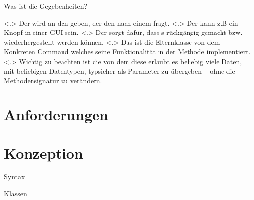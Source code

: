 \begin{frame}{Was ist die Gegebenheiten?}
\begin{itemize}[<+- | alert@+>]
            \note[item]<.>{
              Der  wird an den  geben, der den  nach einem  fragt.
            }
            \note[item]<.>{
              Der  kann z.B ein Knopf in einer GUI sein.
            }
            \note[item]<.>{
              Der  sorgt dafür, dass s rückgängig gemacht bzw. wiederhergestellt werden können.
            }
            \note[item]<.>{
              Das  ist die Elternklasse von dem Konkreten Command welches seine Funktionalität in der  Methode implementiert.
            }
            \note[item]<.>{
              Wichtig zu beachten ist die  von dem  diese erlaubt es beliebig viele Daten, mit beliebigen Datentypen, typsicher als Parameter zu übergeben -- ohne die Methodensignatur zu verändern.
            }
    \end{itemize}
  \end{frame}

\section{Anforderungen}

\section{Konzeption}
  \begin{frame}{Syntax}
  \end{frame}

  \begin{frame}{Klassen}
  \end{frame}

